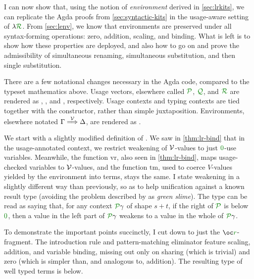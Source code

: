 \def\LRKits{../agda/processed-latex/LRKits.tex}

I can now show that, using the notion of \emph{environment} derived in
\cref{sec:lrkits}, we can replicate the Agda proofs from
\cref{sec:syntactic-kits} in the usage-aware setting of $\name$.
From \cref{sec:lenv}, we know that environments are preserved under all
syntax-forming operations: zero, addition, scaling, and binding.
What is left is to show how these properties are deployed, and also how to
go on and prove the admissibility of simultaneous renaming, simultaneous
substitution, and then single substitution.

There are a few notational changes necessary in the Agda code, compared to the
typeset mathematics above.
Usage vectors, elsewhere called $\grP$, $\grQ$, and $\grR$ are rendered as
, , and , respectively.
Usage contexts and typing contexts are tied together with the
 constructor, rather than simple juxtaposition.
Environments, elsewhere notated $\Gamma \stackrel{\mathcal V}\Longrightarrow \Delta$, are rendered as
\AgdaRecord{[}\AgdaSpace{}\AgdaBound{$\V$}\AgdaSpace{}\AgdaRecord{]}%
\AgdaSpace{}\AgdaBound{$\Gamma$}\AgdaSpace{}%
\AgdaSpace{}\AgdaBound{$\Delta$}.

We start with a slightly modified definition of .
We saw in \cref{thm:lr-bind} that in the usage-annotated context, we restrict
weakening of $\V$-values to just $\gr0$-use variables.
Meanwhile, the function $\mathrm{vr}$, also seen in \cref{thm:lr-bind}, maps
usage-checked variables to $\V$-values, and the function $\mathrm{tm}$, used
to coerce $V$-values yielded by the environment into terms, stays the same.
I state weakening in a slightly different way than previously, so as to help
unification against a known result type (avoiding the problem described by
\citet{McBride12} as \emph{green slime}).
The type \AgdaSpace{}\AgdaBound{$\V$} can be read as
saying that, for any context $\grP\gamma$ of shape $s + t$, if the right of
$\grP$ is below $\gr0$, then a value in the left part of $\grP\gamma$ weakens
to a value in the whole of $\grP\gamma$.

\ExecuteMetaData[\LRKits]{Kit}

To demonstrate the important points succinctly, I cut \name{} down to just the
$\oc\gr r$-fragment.
The introduction rule and pattern-matching eliminator feature scaling, addition,
and variable binding, missing out only on sharing (which is trivial) and zero
(which is simpler than, and analogous to, addition).
The resulting type of well typed terms is below.

